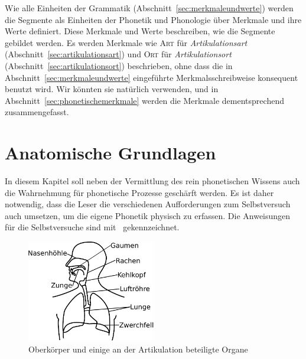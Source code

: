 
Wie alle Einheiten der Grammatik (Abschnitt~\ref{sec:merkmaleundwerte}) werden die Segmente als Einheiten der Phonetik und Phonologie über Merkmale und ihre Werte definiert.
Diese Merkmale und Werte beschreiben, wie die Segmente gebildet werden.
Es werden Merkmale wie \textsc{Art} für \textit{Artikulationsart} (Abschnitt~\ref{sec:artikulationsart}) und \textsc{Ort} für \textit{Artikulationsort} (Abschnitt~\ref{sec:artikulationsort}) beschrieben, ohne dass die in Abschnitt~\ref{sec:merkmaleundwerte} eingeführte Merkmalsschreibweise konsequent benutzt wird.
Wir könnten sie natürlich verwenden, und in Abschnitt~\ref{sec:phonetischemerkmale} werden die Merkmale dementsprechend zusammengefasst.



\Stretch[2]

\section{Anatomische Grundlagen}

\label{sec:anatomischegrundlagen}

In diesem Kapitel soll neben der Vermittlung des rein phonetischen Wissens auch die Wahrnehmung für phonetische Prozesse geschärft werden.
Es ist daher notwendig, dass die Leser die verschiedenen Aufforderungen zum Selbstversuch auch umsetzen, um die eigene Phonetik physisch zu erfassen.
Die Anweisungen für die Selbstversuche sind mit \TuBegin\ gekennzeichnet.

\begin{figure}[!htbp]
  \centering
  \includegraphics[width=0.5\textwidth]{figures/ueberblick}
  \caption{Oberkörper und einige an der Artikulation beteiligte Organe}
  \label{fig:lunge}
\end{figure}

